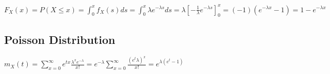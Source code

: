 \begin{math}
  F_X(x) = P(X \le x)
         = \int_0^x{f_X(s)ds}
         = \int_0^x{\lambda e^{-\lambda s}ds}
         = \lambda \left[-\frac{1}{\lambda}e^{-\lambda s} \right ]_0^x
         = (-1)(e^{-\lambda x} -1)
         = 1 - e^{-\lambda x}
\end{math} \\[2pt]

\subsection{Poisson Distribution}
\begin{math}
  m_X(t) = \sum_{x=0}^{\infty}{e^{tx}}\frac{\lambda^x e^{-\lambda}}{x!}
         = e^{-\lambda}\sum_{x = 0}^{\infty}{\frac{(e^t\lambda)^x}{x!}}
         = e^{\lambda(e^t-1)}
\end{math} \\[2pt]
